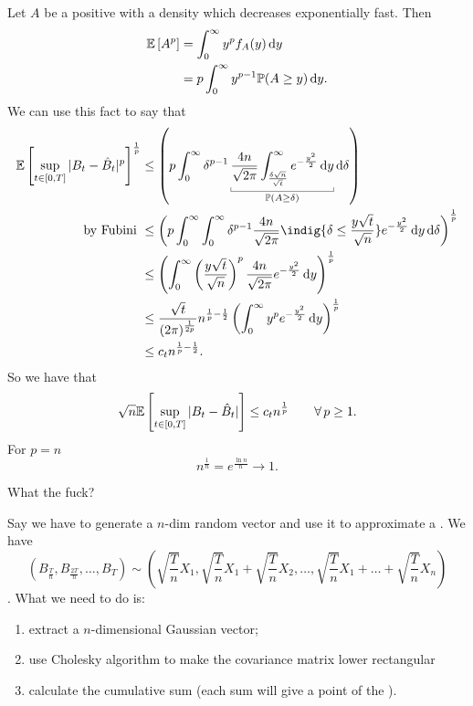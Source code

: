 \documentclass[12pt]{report}
\begin{document}
\begin{fancyproof}
\begin{enumerate}[\circnum]
\begin{equation*}
		\end{equation*}
		Let $A$ be a positive \rv{} with a density which decreases exponentially fast. Then
		\begin{align*}
			\mathbb{E}\left[A^{p}\right]&=\int_{0}^{\infty}y^{p}f_{A}(y)\mathop{}\!\mathrm{d} y\\
			&=p\int_{0}^{\infty}y^{p-1}\mathbb{P}(A\geq y)\mathop{}\!\mathrm{d} y.
		\end{align*}
		We can use this fact to say that
		\begin{align*}
			\ev{\sup_{t\in[0,T]}|B_{t}-\hat{B}_{t}|^{p}}^{\frac{1}{p}}&\leq\left(p\int_{0}^{\infty}\delta^{p-1}\ubracketthin{\frac{4n}{\sqrt{2\pi}}\int_{\frac{\delta\sqrt{n}}{\sqrt{t}}}^{\infty}e^{-\frac{y^{2}}{2}}\dy}_{\pr(A\geq\delta)}\dif\delta\right)\\
			\text{by Fubini }&\leq\left(p\int_{0}^{\infty}\int_{0}^{\infty}\delta^{p-1}\frac{4n}{\sqrt{2\pi}}\indig{\delta\leq\frac{y\sqrt{t}}{\sqrt{n}}}e^{-\frac{y^{2}}{2}}\dy\dif\delta\right)^{\frac{1}{p}}\\
			&\leq\left(\int_{0}^{\infty}\left(\frac{y\sqrt{t}}{\sqrt{n}}\right)^{p}\frac{4n}{\sqrt{2\pi}}e^{-\frac{y^{2}}{2}}\dy\right)^{\frac{1}{p}}\\
			&\leq\frac{\sqrt{t}}{(2\pi)^{\frac{1}{2p}}}n^{\frac{1}{p}-\unmezz}\left(\int_{0}^{\infty}y^{p}e^{-\frac{y^{2}}{2}}\dy\right)^{\frac{1}{p}}\\
			&\leq c_{t}n^{\frac{1}{p}-\unmezz}.
		\end{align*}
		So we have that 
		\begin{equation*}
			\sqrt{n}\mathbb{E}\left[\sup_{t\in[0,T]}|B_{t}-\hat{B}_{t}|\right]\leq c_{t}n^{\frac{1}{p}}\qquad\forall\, p\geq 1.
		\end{equation*}
		For $p=n$
		\begin{equation*}
			n^{\frac{1}{n}}=e^{\frac{\ln n}{n}}\to1.
		\end{equation*}
	\end{enumerate}
\end{fancyproof}
What the fuck?\par
Say we have to generate a $n$-dim random vector and use it to approximate a \bwm. We have
\begin{equation*}
	\left(B_{\frac{T}{n}},B_{\frac{2T}{n}},\ldots,B_{T}\right)\sim\left(\sqrt{\frac{T}{n}}X_1,\sqrt{\frac{T}{n}}X_1+\sqrt{\frac{T}{n}}X_2,\ldots,\sqrt{\frac{T}{n}}X_1+\ldots+\sqrt{\frac{T}{n}}X_n\right)
\end{equation*}.
What we need to do is:
\begin{enumerate}
	\item extract a $n$-dimensional Gaussian vector;
	\item use Cholesky algorithm to make the covariance matrix lower rectangular
	\item calculate the cumulative sum (each sum will give a point of the \bwm).
\end{enumerate}
\end{document}
